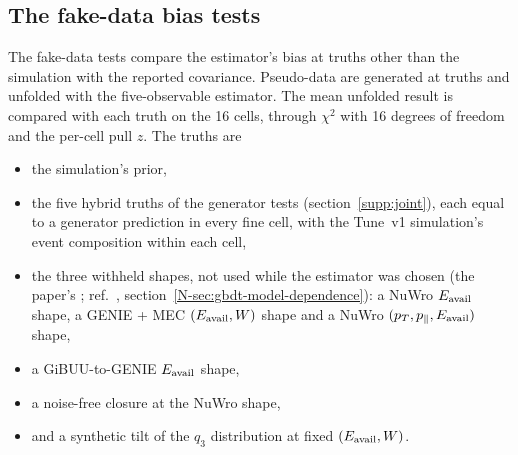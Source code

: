 \subsection{The fake-data bias tests}
\label{supp:study-fd}
\label{sec:fived16-fd}
The fake-data tests compare the estimator's bias at truths other than the simulation with the reported covariance. Pseudo-data are generated at  truths and unfolded with the five-observable estimator. The mean unfolded result is compared with each truth on the 16 cells, through $\chi^2$ with 16 degrees of freedom and the per-cell pull $z$. The truths are
\begin{itemize}[itemsep=0pt, topsep=1pt]
  \item the simulation's prior,
  \item the five hybrid truths of the generator tests (section~\ref{supp:joint}), each equal to a generator prediction in every fine cell, with the Tune~v1 simulation's event composition within each cell,
  \item the three withheld shapes, not used while the estimator was chosen (the paper's ; ref.~\cite{AnalysisNote2026}, section~\ref*{N-sec:gbdt-model-dependence}): a NuWro $E_{\mathrm{avail}}$ shape, a GENIE + MEC $(E_{\mathrm{avail}},W)$ shape and a NuWro $(p_{T},p_{\parallel},E_{\mathrm{avail}})$ shape,
  \item a GiBUU-to-GENIE $E_{\mathrm{avail}}$ shape,
  \item a noise-free closure at the NuWro shape,
  \item and a synthetic tilt of the $q_3$ distribution at fixed $(E_{\mathrm{avail}},W)$.
\end{itemize}
